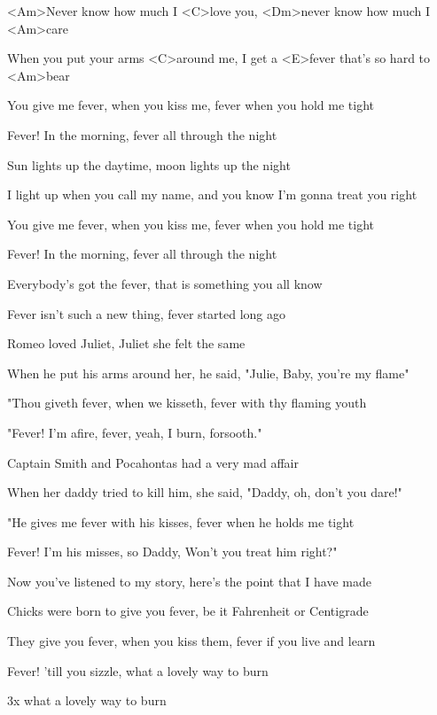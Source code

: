 

\zs
<Am>Never know how much I <C>love you, <Dm>never know how much I <Am>care

When you put your arms <C>around me, I get a <E>fever that's so hard to <Am>bear

You give me fever, when you kiss me, fever when you hold me tight

Fever! In the morning, fever all through the night
\ks

\zs
Sun lights up the daytime, moon lights up the night

I light up when you call my name, and you know I'm gonna treat you right

You give me fever, when you kiss me, fever when you hold me tight

Fever! In the morning, fever all through the night
\ks

\zr
Everybody's got the fever, that is something you all know

Fever isn't such a new thing, fever started long ago
\kr

\zs
Romeo loved Juliet, Juliet she felt the same

When he put his arms around her, he said, "Julie, Baby, you're my flame"

"Thou giveth fever, when we kisseth, fever with thy flaming youth

"Fever! I'm afire, fever, yeah, I burn, forsooth."
\ks

\zs
Captain Smith and Pocahontas had a very mad affair

When her daddy tried to kill him, she said, "Daddy, oh, don't you dare!"

"He gives me fever with his kisses, fever when he holds me tight

Fever! I'm his misses, so Daddy, Won't you treat him right?"
\ks

\zs
Now you've listened to my story, here's the point that I have made

Chicks were born to give you fever, be it Fahrenheit or Centigrade

They give you fever, when you kiss them, fever if you live and learn

Fever! 'till you sizzle, what a lovely way to burn
\ks

3x what a lovely way to burn

\kp
